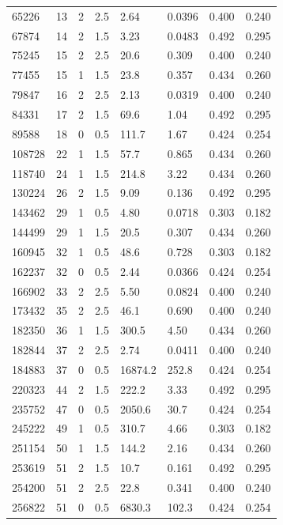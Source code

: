 \documentclass[preview]{standalone}
\begin{document}
{{\begin{tabular}{L{1.2cm}C{1.2cm} C{0.3cm}C{0.5cm} C{1.4cm}C{1.4cm} C{1.4cm}C{1.4cm}}
  65226  &    13  & 2     & 2.5 &  2.64  & 0.0396  & 0.400 &  0.240   \\ 
  67874  &    14  & 2     & 1.5 &  3.23  & 0.0483  & 0.492 &  0.295   \\ 
  75245  &    15  & 2     & 2.5 &  20.6  & 0.309  & 0.400 &  0.240   \\ 
  77455  &    15  & 1     & 1.5 &  23.8  & 0.357  & 0.434 &  0.260   \\ 
  79847  &    16  & 2     & 2.5 &  2.13  & 0.0319  & 0.400 &  0.240   \\ 
  84331  &    17  & 2     & 1.5 &  69.6  & 1.04  & 0.492 &  0.295   \\ 
  89588  &    18  & 0     & 0.5 &  111.7  & 1.67  & 0.424 &  0.254   \\ 
  108728  &    22  & 1     & 1.5 &  57.7  & 0.865  & 0.434 &  0.260   \\ 
  118740  &    24  & 1     & 1.5 &  214.8  & 3.22  & 0.434 &  0.260   \\ 
  130224  &    26  & 2     & 1.5 &  9.09  & 0.136  & 0.492 &  0.295   \\ 
  143462  &    29  & 1     & 0.5 &  4.80  & 0.0718  & 0.303 &  0.182   \\ 
  144499  &    29  & 1     & 1.5 &  20.5  & 0.307  & 0.434 &  0.260   \\ 
  160945  &    32  & 1     & 0.5 &  48.6  & 0.728  & 0.303 &  0.182   \\ 
  162237  &    32  & 0     & 0.5 &  2.44  & 0.0366  & 0.424 &  0.254   \\ 
  166902  &    33  & 2     & 2.5 &  5.50  & 0.0824  & 0.400 &  0.240   \\ 
  173432  &    35  & 2     & 2.5 &  46.1  & 0.690  & 0.400 &  0.240   \\ 
  182350  &    36  & 1     & 1.5 &  300.5  & 4.50  & 0.434 &  0.260   \\ 
  182844  &    37  & 2     & 2.5 &  2.74  & 0.0411  & 0.400 &  0.240   \\ 
  184883  &    37  & 0     & 0.5 &  16874.2  & 252.8  & 0.424 &  0.254   \\ 
  220323  &    44  & 2     & 1.5 &  222.2  & 3.33  & 0.492 &  0.295   \\ 
  235752  &    47  & 0     & 0.5 &  2050.6  & 30.7  & 0.424 &  0.254   \\ 
  245222  &    49  & 1     & 0.5 &  310.7  & 4.66  & 0.303 &  0.182   \\ 
  251154  &    50  & 1     & 1.5 &  144.2  & 2.16  & 0.434 &  0.260   \\ 
  253619  &    51  & 2     & 1.5 &  10.7  & 0.161  & 0.492 &  0.295   \\ 
  254200  &    51  & 2     & 2.5 &  22.8  & 0.341  & 0.400 &  0.240   \\ 
  256822  &    51  & 0     & 0.5 &  6830.3  & 102.3  & 0.424 &  0.254   \\ 
\hline 
\end{tabular} 

}}
\end{document}
